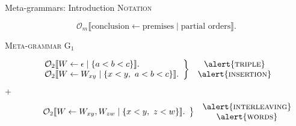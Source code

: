 \documentclass{beamer}
\newcommand{\OrderT}[5]{
	\[ \mathcal{#1}_{#5}\llbracket \text{#2} \leftarrow \text{#3} \mid \text{#4} \rrbracket. \]
}
\newcommand{\Orderr}[5]{
	\mathcal{#1}_{#5}\llbracket #2 \leftarrow #3 \mid \{ #4 \} \rrbracket.
}
\newcommand{\OrdT}[4]{\OrderT{O}{#1}{#2}{#3}{#4}}
\newcommand{\Or}[4]{\Orderr{O}{#1}{#2}{#3}{#4}}
\newcommand\tsc[1]{\alert{\textsc{#1}}}
\begin{document}
  	\begin{frame}{Meta-grammars: Introduction}
	  	\vspace{.7cm}
	  	\center \tsc{Notation}
  		\OrdT{conclusion}{premises}{partial orders}{m}
  		\vspace{.1cm}
  		\pause
  		\begin{center}\tsc{Meta-grammar G$_1$}\end{center}
  		  \[ \left . \
  		  	\begin{array}{ll}
				\Or{W}{\epsilon}{a < b < c}{2} \\
               		\Or{W}{W_{xy}}{x < y,\ a < b < c}{2}
	           \end{array}
           	\right\} \
           	\begin{array}{c}
           		\tsc{triple} \\
	           	\tsc{insertion}
     		      \end{array}
		  \]
  		\pause
  		\hspace{-4cm} \textcolor{ggreen}{+} \vspace{-3mm}
  		\[ \left . \
  		   \hspace{.75cm}
  		   \begin{array}{ll}
		       \Or{W}{W_{xy}, W_{zw}}{x < y,\ z < w}{2}
         	   \end{array}
             \right\} \
             \begin{array}{c}
         		  \tsc{interleaving} \\
           	  \tsc{words}
	        \end{array}
		\]
  		\vspace{.7cm}
  	\end{frame}
\end{document}
